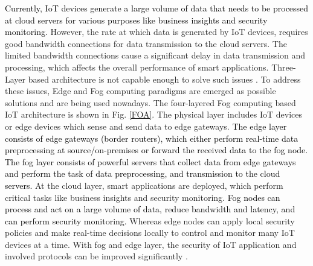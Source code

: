 \documentclass[10pt,journal,sort & compress]{IEEEtran}
\begin{document}
\textcolor{black}{Currently, IoT devices generate a large volume of data that needs to be processed at cloud servers for various purposes like business insights and security monitoring.} However, the rate at which data is generated by IoT devices, requires good bandwidth connections for data transmission to the cloud servers. The limited bandwidth connections cause a significant delay in data transmission and processing, which affects the overall performance of smart applications. Three-Layer based architecture is not capable enough to solve such issues \cite{sethi2017internet}. To address these issues,  Edge and Fog computing paradigms \cite{dastjerdi2016fog} are emerged as possible solutions and are being used nowadays. The four-layered Fog computing based IoT architecture is shown in Fig. \ref{FOA}. The physical layer includes IoT devices or edge devices which sense and send data to edge gateways. \textcolor{black}{The edge layer consists of edge gateways (border routers), which either perform real-time data preprocessing at source/on-premises or forward the received data to the fog node. The fog layer consists of powerful servers that collect data from edge gateways and perform the task of data preprocessing, and transmission to the cloud servers.} At the cloud layer, smart applications are deployed, which perform critical tasks like business insights and security monitoring. \textcolor{black}{Fog nodes can process and act on a large volume of data, reduce bandwidth and latency, and can perform security monitoring.} Whereas edge nodes can apply local security policies and make real-time decisions locally to control and monitor many IoT devices at a time. With fog and edge layer, the security of IoT application and involved protocols can be improved significantly \cite{mukherjee2017security, yi2015security, prabavathy2018design}. 
\end{document}
